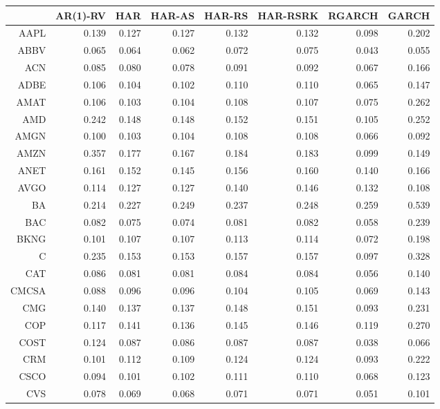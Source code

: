 \begin{table}[ht]
\centering
\begin{tabular}{rrrrrrrr}
  \hline
 & AR(1)-RV & HAR & HAR-AS & HAR-RS & HAR-RSRK & RGARCH & GARCH \\ 
  \hline
AAPL & 0.139 & 0.127 & 0.127 & 0.132 & 0.132 & 0.098 & 0.202 \\ 
  ABBV & 0.065 & 0.064 & 0.062 & 0.072 & 0.075 & 0.043 & 0.055 \\ 
  ACN & 0.085 & 0.080 & 0.078 & 0.091 & 0.092 & 0.067 & 0.166 \\ 
  ADBE & 0.106 & 0.104 & 0.102 & 0.110 & 0.110 & 0.065 & 0.147 \\ 
  AMAT & 0.106 & 0.103 & 0.104 & 0.108 & 0.107 & 0.075 & 0.262 \\ 
  AMD & 0.242 & 0.148 & 0.148 & 0.152 & 0.151 & 0.105 & 0.252 \\ 
  AMGN & 0.100 & 0.103 & 0.104 & 0.108 & 0.108 & 0.066 & 0.092 \\ 
  AMZN & 0.357 & 0.177 & 0.167 & 0.184 & 0.183 & 0.099 & 0.149 \\ 
  ANET & 0.161 & 0.152 & 0.145 & 0.156 & 0.160 & 0.140 & 0.166 \\ 
  AVGO & 0.114 & 0.127 & 0.127 & 0.140 & 0.146 & 0.132 & 0.108 \\ 
  BA & 0.214 & 0.227 & 0.249 & 0.237 & 0.248 & 0.259 & 0.539 \\ 
  BAC & 0.082 & 0.075 & 0.074 & 0.081 & 0.082 & 0.058 & 0.239 \\ 
  BKNG & 0.101 & 0.107 & 0.107 & 0.113 & 0.114 & 0.072 & 0.198 \\ 
  C & 0.235 & 0.153 & 0.153 & 0.157 & 0.157 & 0.097 & 0.328 \\ 
  CAT & 0.086 & 0.081 & 0.081 & 0.084 & 0.084 & 0.056 & 0.140 \\ 
  CMCSA & 0.088 & 0.096 & 0.096 & 0.104 & 0.105 & 0.069 & 0.143 \\ 
  CMG & 0.140 & 0.137 & 0.137 & 0.148 & 0.151 & 0.093 & 0.231 \\ 
  COP & 0.117 & 0.141 & 0.136 & 0.145 & 0.146 & 0.119 & 0.270 \\ 
  COST & 0.124 & 0.087 & 0.086 & 0.087 & 0.087 & 0.038 & 0.066 \\ 
  CRM & 0.101 & 0.112 & 0.109 & 0.124 & 0.124 & 0.093 & 0.222 \\ 
  CSCO & 0.094 & 0.101 & 0.102 & 0.111 & 0.110 & 0.068 & 0.123 \\ 
  CVS & 0.078 & 0.069 & 0.068 & 0.071 & 0.071 & 0.051 & 0.101 \\ 

\end{tabular}
\end{table}
